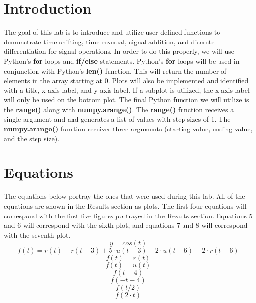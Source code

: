 \documentclass[12pt]{report}
\begin{document}
\section{Introduction}
 

The goal of this lab is to introduce and utilize user-defined functions to demonstrate time shifting, time reversal, signal addition, and discrete differentiation for signal operations. In order to do this properly, we will use Python's \textbf{for} loops and \textbf{if/else} statements. Python's \textbf{for} loops will be used in conjunction with Python's \textbf{len()} function. This will return the number of elements in the array starting at 0. Plots will also be implemented and identified with a title, x-axis label, and y-axis label. If a subplot is utilized, the x-axis label will only be used on the bottom plot. The final Python function we will utilize is the \textbf{range()} along with \textbf{numpy.arange()}. The \textbf{range()} function receives a single argument and and generates a list of values with step sizes of 1. The \textbf{numpy.arange()} function receives three arguments (starting value, ending value, and the step size). 

\section{Equations}

The equations below portray the ones that were used during this lab. All of the equations are shown in the Results section as plots. The first four equations will correspond with the first five figures portrayed in the Results section. Equations 5 and 6 will correspond with the sixth plot, and equations 7 and 8 will correspond with the seventh plot.
\begin{equation}
    y = cos(t)
\end{equation}
\begin{equation}
    f(t) = r(t) - r(t-3) + 5\cdot u(t-3) - 2\cdot u(t-6) - 2\cdot r(t-6)
\end{equation}
\begin{equation}
    f(t) = r(t)
\end{equation}
\begin{equation}
    f(t) = u(t)
\end{equation}
\begin{equation}
    f(t-4)
\end{equation}
\begin{equation}
    f(-t-4)
\end{equation}
\begin{equation}
    f(t/2)
\end{equation}
\begin{equation}
    f(2\cdot t)
\end{equation}
\end{document}
